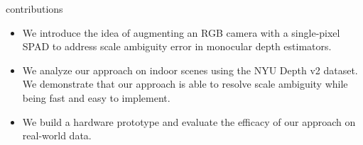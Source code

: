 contributions
%
\begin{itemize}
	\item We introduce the idea of augmenting an RGB camera with a single-pixel
    SPAD to address scale ambiguity error in monocular depth estimators.	
  \item We analyze our approach on indoor scenes using the NYU Depth v2 dataset.
    We demonstrate that our approach is able to resolve scale ambiguity while
    being fast and easy to implement.
	\item We build a hardware prototype and evaluate the efficacy of our
    approach on real-world data. 
\end{itemize}


